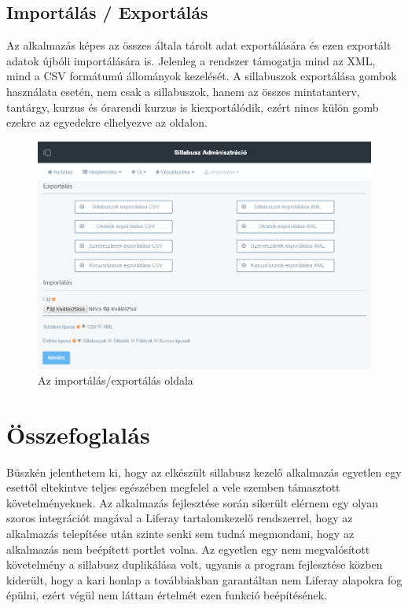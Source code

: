 \documentclass[hidelinks, 12pt, a4paper]{report}
\begin{document}
\section{Importálás / Exportálás}

Az alkalmazás képes az összes általa tárolt adat exportálására és ezen exportált adatok újbóli importálására is. Jelenleg a rendszer támogatja mind az XML, mind a CSV formátumú állományok kezelését. A sillabuszok exportálása gombok használata esetén, nem csak a sillabuszok, hanem az összes mintatanterv, tantárgy, kurzus és órarendi kurzus is kiexportálódik, ezért nincs külön gomb ezekre az egyedekre elhelyezve az oldalon.

\begin{figure}[H]
    \centering
	\includegraphics[width=\textwidth]{sm_import_export.png}
	\caption{Az importálás/exportálás oldala}
\end{figure}

\chapter{Összefoglalás}

Büszkén jelenthetem ki, hogy az elkészült sillabusz kezelő alkalmazás egyetlen egy esettől eltekintve teljes egészében megfelel a vele szemben támasztott követelményeknek. Az alkalmazás fejlesztése során sikerült elérnem egy olyan szoros integrációt magával a Liferay tartalomkezelő rendszerrel, hogy az alkalmazás telepítése után szinte senki sem tudná megmondani, hogy az alkalmazás nem beépített portlet volna. Az egyetlen egy nem megvalósított követelmény a sillabusz duplikálása volt, ugyanis a program fejlesztése közben kiderült, hogy a kari honlap a továbbiakban garantáltan nem Liferay alapokra fog épülni, ezért végül nem láttam értelmét ezen funkció beépítésének.
\end{document}
